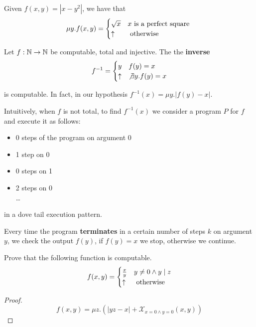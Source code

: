 \begin{example}
  Given $f(x,y) = |x-y^2|$, we have that
  \[
    \mu y. f(x,y) =
    \begin{cases}
      \sqrt{x} & x $ is a perfect square $ \\
      \uparrow & $ otherwise $
    \end{cases}
  \]
\end{example}

\begin{exercise}
  Let $f:\mathbb{N}\rightarrow\mathbb{N}$ be computable, total and injective. The
  the \textbf{inverse} 
  \[
  f^{-1} = \begin{cases}
    y        & f(y) = x                \\
    \uparrow & \not\exists y. f(y) = x
\end{cases}
\]

is computable. In fact, in our hypothesis $f^{-1}(x) = \mu y. |f(y)-x|$.
\end{exercise}

\begin{observation}
Intuitively, when $f$ is not total, to find $f^{-1}(x)$ we consider a program $P$ for $f$ and execute it as follows:
\begin{itemize}
\item 0 steps of the program on argument 0
\item 1 step on 0
\item 0 steps on 1
\item 2 steps on 0\\
  \dots
\end{itemize}
in a dove tail execution pattern.

Every time the program \textbf{terminates} in a certain number of steps $k$ on argument $y$, we check the output $f(y)$, if $f(y) = x$ we stop, otherwise we continue.
\end{observation}

\begin{exercise}
  Prove that the following function is computable.
  \[f(x,y) = \begin{cases}
    \frac{x}{y} & y\not= 0 \land y \mid z \\
    \uparrow    & $ otherwise $
  \end{cases}\]
  \begin{proof}
    \[ f(x,y) = \mu z. (|yz-x| + \mathcal{X}_{x=0\land y=0}(x,y)) \]
  \end{proof}
\end{exercise}


